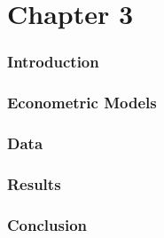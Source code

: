 \part{Chapter 3} 

\section{Introduction}

\blindtext

\section{Econometric Models} 
\blindtext

\section{Data}
\blindtext

\section{Results}
\blindtext

\section{Conclusion}

\blindtext
